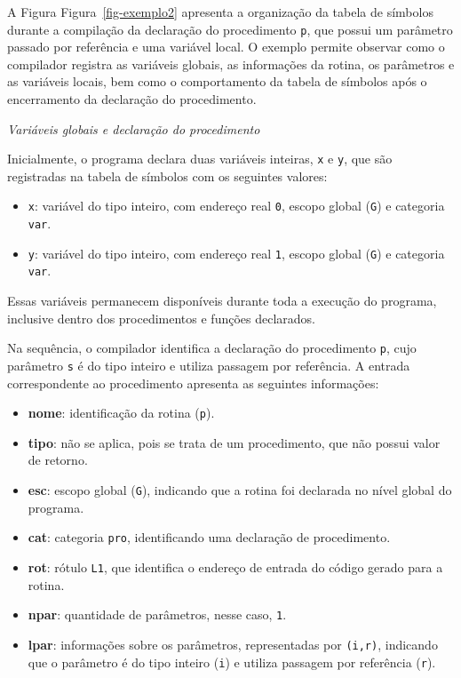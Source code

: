 \documentclass[
  brazilian,
  letterpaper,
]{book}
\providecommand{\tightlist}{%
  \setlength{\itemsep}{0pt}\setlength{\parskip}{0pt}}
\theoremstyle{plain}
\theoremstyle{definition}
\theoremstyle{remark}
\begin{document}
A Figura Figura~\ref{fig-exemplo2} apresenta a organização da tabela de
símbolos durante a compilação da declaração do procedimento \texttt{p},
que possui um parâmetro passado por referência e uma variável local. O
exemplo permite observar como o compilador registra as variáveis
globais, as informações da rotina, os parâmetros e as variáveis locais,
bem como o comportamento da tabela de símbolos após o encerramento da
declaração do procedimento.

\emph{Variáveis globais e declaração do procedimento}

Inicialmente, o programa declara duas variáveis inteiras, \texttt{x} e
\texttt{y}, que são registradas na tabela de símbolos com os seguintes
valores:

\begin{itemize}
\tightlist
\item
  \texttt{x}: variável do tipo inteiro, com endereço real \texttt{0},
  escopo global (\texttt{G}) e categoria \texttt{var}.
\item
  \texttt{y}: variável do tipo inteiro, com endereço real \texttt{1},
  escopo global (\texttt{G}) e categoria \texttt{var}.
\end{itemize}

Essas variáveis permanecem disponíveis durante toda a execução do
programa, inclusive dentro dos procedimentos e funções declarados.

Na sequência, o compilador identifica a declaração do procedimento
\texttt{p}, cujo parâmetro \texttt{s} é do tipo inteiro e utiliza
passagem por referência. A entrada correspondente ao procedimento
apresenta as seguintes informações:

\begin{itemize}
\tightlist
\item
  \textbf{nome}: identificação da rotina (\texttt{p}).
\item
  \textbf{tipo}: não se aplica, pois se trata de um procedimento, que
  não possui valor de retorno.
\item
  \textbf{esc}: escopo global (\texttt{G}), indicando que a rotina foi
  declarada no nível global do programa.
\item
  \textbf{cat}: categoria \texttt{pro}, identificando uma declaração de
  procedimento.
\item
  \textbf{rot}: rótulo \texttt{L1}, que identifica o endereço de entrada
  do código gerado para a rotina.
\item
  \textbf{npar}: quantidade de parâmetros, nesse caso, \texttt{1}.
\item
  \textbf{lpar}: informações sobre os parâmetros, representadas por
  \texttt{(i,r)}, indicando que o parâmetro é do tipo inteiro
  (\texttt{i}) e utiliza passagem por referência (\texttt{r}).
\end{itemize}
\end{document}
